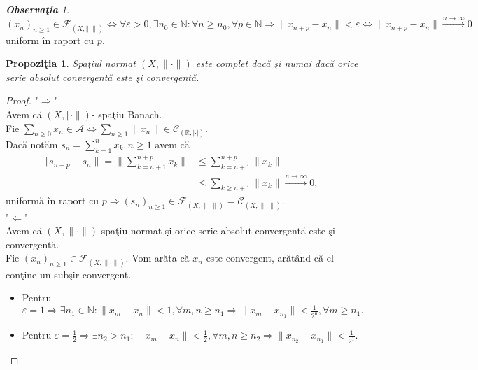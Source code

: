 \documentclass[ a4paper, 12pt]{report}
\newtheorem{prop}[theorem]{\bf Propozi\c tia }
\theoremstyle{remark}
\newtheorem{obs}{\bf Observa\c tia }[section]
\numberwithin{equation}{section}
\begin{document}
\begin{obs}
$(x_n)_{n \geq 1} \in \mathcal{F}_{(X, \Vert \cdot \rVert)} \Leftrightarrow \forall \varepsilon>0, \exists n_0 \in \mathbb{N}: \forall n \geq n_0, \forall p \in \mathbb{N} \Rightarrow \lVert x_{n+p} - x_n \rVert < \varepsilon \Leftrightarrow \lVert x_{n+p} - x_n \rVert \stackrel{n \rightarrow \infty}{\longrightarrow} 0$ uniform \^in raport cu $p$.
\end{obs}
\begin{prop}
Spa\c tiul normat $(X,\lVert \cdot \rVert)$ este complet dac\u a \c si numai dac\u a orice serie absolut convergent\u a este \c si convergent\u a.
\end{prop}
\begin{proof}
"$\Longrightarrow$"\\
Avem c\u a  $(X, \Vert \cdot \rVert)$- spa\c tiu Banach.\\
Fie $\sum\limits_{n \geq 0} x_n \in \mathcal{A} \Leftrightarrow \sum\limits_{n \geq 1} \lVert x_n \rVert \in \mathcal{C}_{(\mathbb{R},\lvert \cdot \rvert)} .$\\
Dac\u a not\u am $s_n = \sum\limits_{k=1}^{n} x_k, n \geq 1$ avem c\u a
\begin{align*}
\Vert s_{n+p} - s_n \rVert =\lVert \sum\limits_{k=n+1}^{n+p} x_k \rVert
&\leq  \sum\limits_{k=n+1}^{n+p} \lVert x_k \rVert\\
&\leq \sum\limits_{k \geq n+1} \lVert x_k \rVert \stackrel{n \rightarrow \infty}{\longrightarrow}0,
\end{align*} uniform\u a \^in raport cu $p \Rightarrow (s_n)_{n \geq 1} \in \mathcal{F}_{(X,\lVert \cdot \rVert)} = \mathcal{C}_{(X, \lVert  \cdot\rVert)}.$\\
"$\Longleftarrow$"\\
Avem c\u a $(X,\lVert \cdot \rVert)$ spa\c tiu normat \c si  orice serie absolut convergent\u a este \c si convergent\u a.\\
Fie $(x_n)_{n \geq 1} \in \mathcal{F}_{(X, \lVert \cdot \rVert)}$. Vom ar\u ata c\u a $x_n$ este convergent, ar\u at\^and c\u a el con\c tine un sub\c sir convergent.\\
\begin{itemize}
\item Pentru $\varepsilon=1 \Rightarrow \exists n_1 \in \mathbb{N}: \lVert x_m - x_n \rVert < 1, \forall m,n \geq n_1 \Rightarrow \lVert x_m-x_{n_1}\rVert<\frac{1}{2^0}, \forall m \geq n_1.$
\item Pentru $\varepsilon=\frac{1}{2} \Rightarrow
\exists n_2 > n_1: \lVert x_m - x_n \rVert < \frac{1}{2}, \forall m,n \geq n_2 \Rightarrow \lVert x_{n_2}-x_{n_1}\rVert<\frac{1}{2^1}.$

\end{itemize}
\end{proof}
\end{document}
